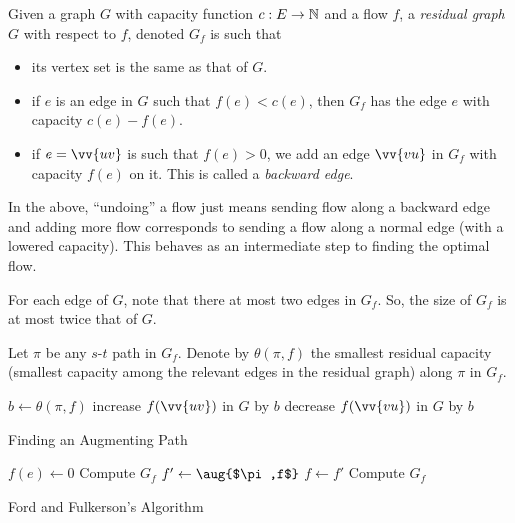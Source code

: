 	\begin{definition}
		Given a graph $G$ with capacity function $c:E\to\mathbb{N}$ and a flow $f$, a \textit{residual graph} $G$ with respect to $f$, denoted $G_f$ is such that
		\begin{itemize}
			\item its vertex set is the same as that of $G$.
			\item if $e$ is an edge in $G$ such that $f(e)<c(e)$, then $G_f$ has the edge $e$ with capacity $c(e)-f(e)$.
			\item if $e=\vv{uv}$ is such that $f(e)>0$, we add an edge $\vv{vu}$ in $G_f$ with capacity $f(e)$ on it. This is called a \textit{backward edge}.
		\end{itemize}
	\end{definition}

	In the above, ``undoing'' a flow just means sending flow along a backward edge and adding more flow corresponds to sending a flow along a normal edge (with a lowered capacity). This behaves as an intermediate step to finding the optimal flow.

	For each edge of $G$, note that there at most two edges in $G_f$. So, the size of $G_f$ is at most twice that of $G$.

	Let $\pi$ be any $s$-$t$ path in $G_f$. Denote by $\theta(\pi,f)$ the smallest residual capacity (smallest capacity among the relevant edges in the residual graph) along $\pi$ in $G_f$.

	\begin{algorithm}[H]
		\DontPrintSemicolon
		\SetNoFillComment
		 {
			$b\gets\theta(\pi,f)$\;
			 {
				 {
					increase $f(\vv{uv})$ in $G$ by $b$
				} {
					decrease $f(\vv{vu})$ in $G$ by $b$
				}
			}
		}
		\caption{Finding an Augmenting Path}\label{algo: aug path}
	\end{algorithm}

	\begin{algorithm}[H]
		\DontPrintSemicolon
		\SetNoFillComment
		 {
			$f(e)\gets 0$
		}
		Compute $G_f$\;
		 {
			$f'\gets\aug{$\pi,f$}$\;
			$f\gets f'$\;
			Compute $G_f$
		}
		\;
		\caption{Ford and Fulkerson's Algorithm}\label{algo: max flow}
	\end{algorithm}

